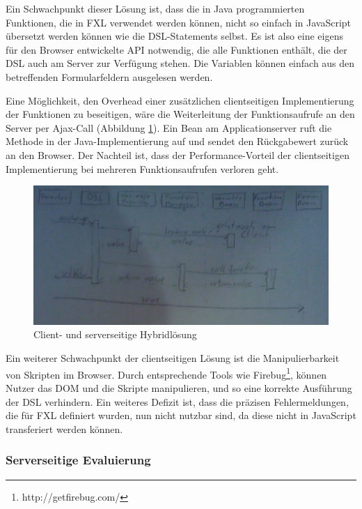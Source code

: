 Ein Schwachpunkt dieser Lösung ist, dass die in Java programmierten Funktionen, die in FXL verwendet werden können, nicht so einfach in Java\-Script übersetzt werden können wie die DSL-Statements selbst. Es ist also eine eigens für den Browser entwickelte API not\-wen\-dig, die alle Funktionen enthält, die der DSL auch am Server zur Verfügung stehen. Die Variablen können einfach aus den betreffenden Formularfeldern ausgelesen werden.

Eine Möglichkeit, den Overhead einer zusätzlichen clientseitigen Implementierung der Funktionen zu beseitigen, wäre die Weiterleitung der Funktionsaufrufe an den Server per Ajax-Call (Abbildung \ref{abb_uml_seq_client_hybrid}). Ein Bean am Applicationserver ruft die Methode in der Java-Implementierung auf und sendet den Rückgabewert zurück an den Browser. Der Nachteil ist, dass der Performance-Vorteil der clientseitigen Implementierung bei mehreren Funktionsaufrufen verloren geht.

\begin{figure}[h]
\includegraphics[scale=0.5]{figures/uml_seq_client_hybrid}
\caption{Client- und serverseitige Hybridlösung}
\label{abb_uml_seq_client_hybrid}
\end{figure}

Ein weiterer Schwachpunkt der clientseitigen Lösung ist die Manipulierbarkeit von Skripten im Browser. Durch entsprechende Tools wie Firebug\footnote{http://getfirebug.com/}, können Nutzer das DOM und die Skripte manipulieren, und so eine korrekte Ausführung der DSL verhindern. Ein weiteres Defizit ist, dass die präzisen Fehlermeldungen, die für FXL definiert wurden, nun nicht nutzbar sind, da diese nicht in Java\-Script transferiert werden können.

\subsubsection{Serverseitige Evaluierung}

